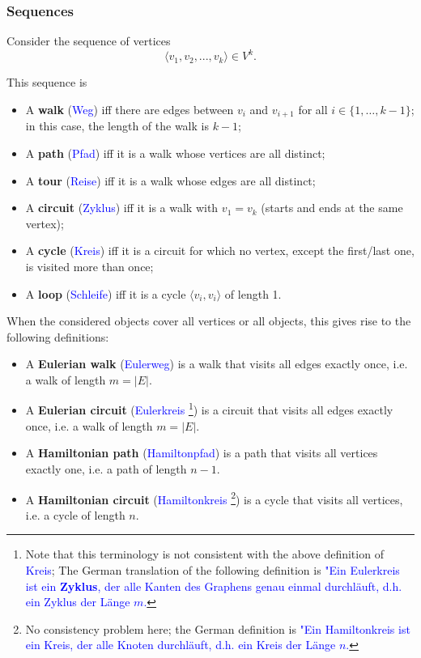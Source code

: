 \documentclass[a4paper]{article}
\begin{document}
\subsubsection{Sequences}

Consider the sequence of vertices
$$\langle v_1, v_2, ..., v_k\rangle \in V^k.$$

This sequence is
\begin{itemize}
\item A \textbf{walk} (\textcolor{blue}{{Weg}}) iff there are edges between $v_i$ and $v_{i+1}$ for all $i\in\{1, \dots, k-1\}$; in this case, the length of the walk is $k-1$;
\item A \textbf{path} (\textcolor{blue}{{Pfad}}) iff it is a walk whose vertices are all distinct;
\item A \textbf{tour} (\textcolor{blue}{{Reise}}) iff it is a walk whose edges are all distinct;
\item A \textbf{circuit} (\textcolor{blue}{{Zyklus}}) iff it is a walk with $v_1 = v_k$ (starts and ends at the same vertex);
\item A \textbf{cycle} (\textcolor{blue}{{Kreis}}) iff it is a circuit for which no vertex, except the first/last one, is visited more than once;
\item A \textbf{loop} (\textcolor{blue}{{Schleife}}) iff it is a cycle $\langle v_i, v_i\rangle$ of length 1.
\end{itemize}

When the considered objects cover all vertices or all objects, this gives rise to the following definitions:
\begin{itemize}
\item A \textbf{Eulerian walk} (\textcolor{blue}{{Eulerweg}}) is a walk that visits all edges exactly once, i.e. a walk of length $m = |E|$.

\item A \textbf{Eulerian circuit} (\textcolor{blue}{{Eulerkreis}} \footnote{Note that this terminology is not consistent with the above definition of \textcolor{blue}{Kreis}; The German translation of the following definition is \textcolor{blue}{"Ein Eulerkreis ist ein \textbf{Zyklus}, der alle Kanten des Graphens genau einmal durchläuft, d.h. ein Zyklus der Länge $m$.}}) is a circuit that visits all edges exactly once, i.e. a walk of length $m = |E|$.
\item A \textbf{Hamiltonian path} (\textcolor{blue}{{Hamiltonpfad}}) is a path that visits all vertices exactly one, i.e. a path of length $n-1$.
\item A \textbf{Hamiltonian circuit} (\textcolor{blue}{{Hamiltonkreis}} \footnote{No consistency problem here; the German definition is \textcolor{blue}{"Ein Hamiltonkreis ist ein Kreis, der alle Knoten durchläuft, d.h. ein Kreis der Länge $n$.}}) is a cycle that visits all vertices, i.e. a cycle of length $n$.
\end{itemize}
\end{document}
